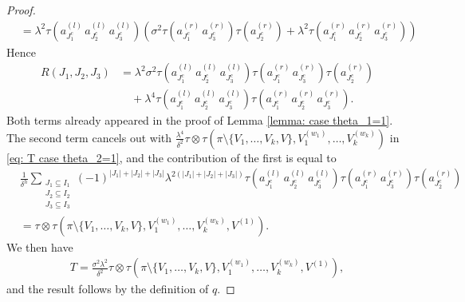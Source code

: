 \documentclass[12pt,reqno]{amsart}
\theoremstyle{plain}
\newcommand{\1}{\mathbf{1}}
\begin{document}
\begin{proof}
\begin{align*}
        &=\lambda^2\tau\left(a_{J_1^c}^{(l)}\, a_{J_2^c}^{(l)}\, a_{J_3^c}^{(l)}\right)\left(\sigma^2\tau(a_{J_1^c}^{(r)}\, a_{J_3^c}^{(r)})\tau(a_{J_2^c}^{(r)})+\lambda^2\tau(a_{J_1^c}^{(r)}\, a_{J_2^c}^{(r)}\, a_{J_3^c}^{(r)})\right)
    \end{align*}
    Hence
    \begin{align*}
        R(J_1,J_2,J_3)&=\lambda^2\sigma^2\tau\left(a_{J_1^c}^{(l)}\, a_{J_2^c}^{(l)}\, a_{J_3^c}^{(l)}\right)\tau\left(a_{J_1^c}^{(r)}\, a_{J_3^c}^{(r)}\right)\tau\left(a_{J_2^c}^{(r)}\right) \\
        &\quad+\lambda^4\tau\left(a_{J_1^c}^{(l)}\, a_{J_2^c}^{(l)}\, a_{J_3^c}^{(l)}\right)\tau\left(a_{J_1^c}^{(r)}\, a_{J_2^c}^{(r)}\, a_{J_3^c}^{(r)}\right).
    \end{align*}
    Both terms already appeared in the proof of Lemma \ref{lemma: case theta_1=1}. The second term cancels out with $\frac{\lambda^4}{\delta^2}\tau\otimes \tau\left(\pi\setminus\{V_1,\ldots, V_k,V\}, V_1^{(w_1)},\ldots, V_k^{(w_k)}\right)$ in \eqref{eq: T case theta_2=1}, and the contribution of the first is equal to
    \begin{align*}
        &\frac{1}{\delta^h}\sum_{\substack{J_1 \subseteq I_1\\ J_2 \subseteq I_2\\ J_3 \subseteq I_3}}(-1)^{|J_1|+|J_2|+|J_3|}\lambda^{2(|J_1|+|J_2|+|J_3|)}\tau\left(a_{J_1^c}^{(l)}\, a_{J_2^c}^{(l)}\, a_{J_3^c}^{(l)}\right)\tau\left(a_{J_1^c}^{(r)}\, a_{J_3^c}^{(r)}\right)\tau\left(a_{J_2^c}^{(r)}\right)\\
        &=\tau\otimes \tau\left(\pi\setminus\{V_1,\ldots,V_k,V\},V_1^{(w_1)},\ldots,V_k^{(w_k)},V^{(1)}\right).
    \end{align*}
    We then have
    \begin{align*}
        T=\frac{\sigma^2\lambda^2}{\delta^2}\tau\otimes \tau\left(\pi\setminus\{V_1,\ldots,V_k,V\},V_1^{(w_1)},\ldots,V_k^{(w_k)},V^{(1)}\right),
    \end{align*}
    and the result follows by the definition of $q$.
\end{proof}
\end{document}
